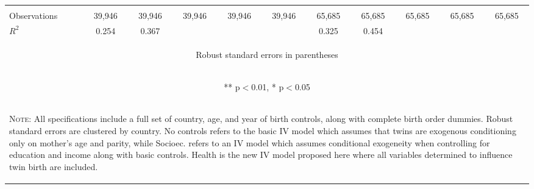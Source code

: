 \documentclass{article}[11pt,subeqn]
\begin{document}
\begin{spacing}{1.5}
\begin{sidewaystable}[!htbp]
\begin{center}
\begin{tabular}{lcccccccccc}
																					
\vspace{4pt} & \begin{footnotesize}\end{footnotesize} &  \begin{footnotesize}\end{footnotesize} & \begin{footnotesize}\end{footnotesize} & \begin{footnotesize}\end{footnotesize} & \begin{footnotesize}\end{footnotesize} & \begin{footnotesize}\end{footnotesize} & \begin{footnotesize}\end{footnotesize} & \begin{footnotesize}\end{footnotesize} & \begin{footnotesize}\end{footnotesize} & \begin{footnotesize}\end{footnotesize} \\																					
Observations & 39,946 & 39,946 & 39,946 & 39,946 & 39,946 & 65,685 & 65,685 & 65,685 & 65,685 & 65,685 \\																					
$R^2$ & 0.254 & 0.367 & & & &0.325 & 0.454 &  & & \\ \midrule																					
\multicolumn{11}{c}{\begin{footnotesize} Robust standard errors in parentheses\end{footnotesize}} \\																					
\multicolumn{11}{c}{\begin{footnotesize} ** p$<$0.01, * p$<$0.05 \end{footnotesize}} \\																					
\bottomrule																					
\multicolumn{11}{p{21cm}}{\setstretch{0.9}\begin{footnotesize}\textsc{Note:} All specifications include a full set of country, age, and year of birth controls, along with complete birth order dummies. Robust standard errors are clustered by country.	No controls refers to the basic IV model which assumes that twins are exogenous conditioning only on mother's age and parity, while Socioec. refers to an IV
model which assumes conditional exogeneity when controlling for education and income along with basic controls.	  Health is the new IV model proposed here where all variables determined to influence twin birth are included. 	
\end{footnotesize}}\\																					
\end{tabular}																					
\end{center}																					
\end{sidewaystable}																					




\end{spacing}
\end{document}
